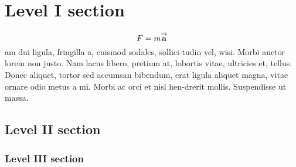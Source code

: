\documentclass[12 pt]{article}
\begin{document}
\tableofcontents
\section{Level I section}
\lipsum[1]
\[
    F = m \Vector{a}
\]
am dui ligula, fringilla a, euismod sodales, sollici-tudin vel, wisi.
Morbi auctor lorem non justo.
Nam  lacus libero, pretium at, lobortis vitae, ultricies et, tellus.
Donec aliquet, tortor sed accumsan bibendum, erat ligula aliquet magna, vitae ornare odio metus a mi.
Morbi ac orci et nisl hen-drerit mollis.
Suspendisse ut massa.

\subsection{Level II section}
\lipsum[3]

\subsubsection{Level III section}
\lipsum[4]
\end{document}
